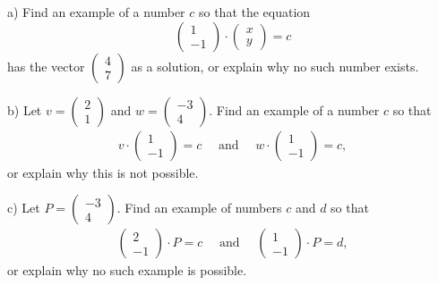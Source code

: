 \documentclass[cahier-main.tex]{subfiles}
\begin{document}
\begin{task}
\begin{compactitem}
\item[a)] Find an example of a number $c$ so that the equation
\[
\begin{pmatrix} 1 \\ -1 \end{pmatrix} \cdot \begin{pmatrix} x \\ y \end{pmatrix} = c
\]
has the vector $\left(\begin{smallmatrix}4 \\ 7 \end{smallmatrix}\right)$ as a solution, or explain why no such number exists.
\item[b)] Let $v = \left(\begin{smallmatrix}2\\1\end{smallmatrix}\right)$ and $w=\left(\begin{smallmatrix}-3\\4\end{smallmatrix}\right)$. Find an example of a number $c$ so that 
\begin{gather*} 
v \cdot \begin{pmatrix}1\\-1\end{pmatrix} = c \quad\text{ and } \quad w \cdot \begin{pmatrix}1\\-1\end{pmatrix} = c, 
\end{gather*}
or explain why this is not possible.
\item[c)] Let $P = \left(\begin{smallmatrix}-3\\4\end{smallmatrix}\right)$. Find an example of numbers $c$ and $d$ so that 
\begin{gather*} \begin{pmatrix} 2\\-1\end{pmatrix}\cdot P = c \quad\text{ and } \quad \begin{pmatrix} 1\\-1\end{pmatrix}\cdot P = d, 
\end{gather*} 
or explain why no such example is possible.
\end{compactitem}
\end{task}
\end{document}
